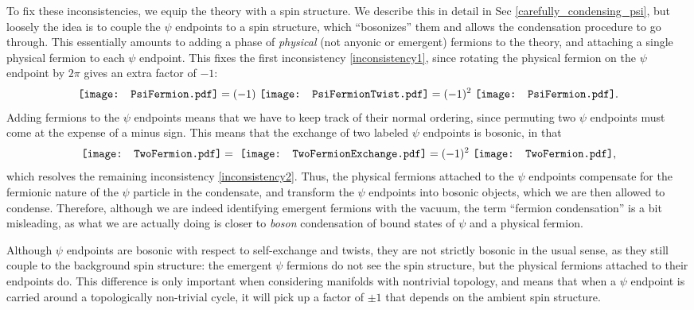 \documentclass[12pt,a4paper]{article}
\newcommand{\PsiFermion}{\mathord{\vcenter{\hbox{\texttt{[image: PsiFermion.pdf]}}}}}
\newcommand{\PsiFermionTwist}{\mathord{\vcenter{\hbox{\texttt{[image: PsiFermionTwist.pdf]}}}}}
\newcommand{\TwoFermion}{\mathord{\vcenter{\hbox{\texttt{[image: TwoFermion.pdf]}}}}}
\newcommand{\TwoFermionExchange}{\mathord{\vcenter{\hbox{\texttt{[image: TwoFermionExchange.pdf]}}}}}
\begin{document}
To fix these inconsistencies, we equip the theory with a spin structure. We describe this in detail in Sec \ref{carefully_condensing_psi}, but loosely the idea is to couple the $\psi$ endpoints to a spin structure, which ``bosonizes'' them and allows the condensation procedure to go through. This essentially amounts to adding a phase of {\it physical} (not anyonic or emergent) fermions to the theory, and attaching a single physical fermion to each $\psi$ endpoint. 
This fixes the first inconsistency \eqref{inconsistency1}, since rotating the physical fermion on the $\psi$ endpoint by $2\pi$ gives an extra factor of $-1$:
\begin{align} \label{boxspin}
\PsiFermion = (-1)\ \PsiFermionTwist = (-1)^2\ \PsiFermion. 
\end{align}
Adding fermions to the $\psi$ endpoints means that we have to keep track of their normal ordering, since permuting two $\psi$ endpoints must come at the expense of a minus sign. 
This means that the exchange of two labeled $\psi$ endpoints is bosonic, in that 
\begin{align} \label{boxbraid}
\TwoFermion =\ \TwoFermionExchange = (-1)^2\ \TwoFermion,
\end{align}
which resolves the remaining inconsistency \eqref{inconsistency2}. Thus, the physical fermions attached to the $\psi$ endpoints compensate for the fermionic nature of the $\psi$ particle in the condensate, and transform the $\psi$ endpoints into bosonic objects, which we are then allowed to condense. Therefore, although we are indeed identifying emergent fermions with the vacuum, the term ``fermion condensation'' is a bit misleading, as what we are actually doing is closer to {\it boson} condensation of bound states of $\psi$ and a physical fermion. 

Although $\psi$ endpoints are bosonic with respect to self-exchange and twists, they are not strictly bosonic in the usual sense, as they still couple to the background spin structure: the emergent $\psi$ fermions do not see the spin structure, but the physical fermions attached to their endpoints do. This difference is only important when considering manifolds with nontrivial topology, and means that when a $\psi$ endpoint is carried around a topologically non-trivial cycle, it will pick up a factor of $\pm1$ that depends on the ambient spin structure. 
\end{document}
